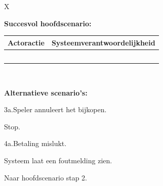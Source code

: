 \begin{xltabular}{\textwidth}{X}
   \hline

   \begin{minipage}[t]{\linewidth}
      \textbf{Succesvol hoofdscenario:}

      \begin{tabularx}{\linewidth}{XX}
         \textbf{Actoractie}                                     & \textbf{Systeemverantwoordelijkheid}                                                        \\
         \hline
         \usecasestep{Speler geeft aan credits te willen kopen.} &                                                                                             \\
                                                                 & \usecasestep{Systeem laat de mogelijke aantallen en de bijbehorende prijzen zien.}          \\
         \usecasestep{Speler kiest een aantal credits.}          &                                                                                             \\
         \usecasestep{Speler betaalt het voorgestelde bedrag.}   &                                                                                             \\
                                                                 & \usecasestep{Systeem schrijft het door de speler gekozen aantal credits bij de speler bij.}
      \end{tabularx}
   \end{minipage} \\

   \hline

   \begin{minipage}[t]{\linewidth}
      \textbf{Alternatieve scenario's:}

      3a.\:Speler annuleert het bijkopen.
      \begin{smallenumerate}
         \item Stop.
      \end{smallenumerate}
      \bigskip

      4a.\:Betaling mislukt.
      \begin{smallenumerate}
         \item Systeem laat een foutmelding zien.
         \item Naar hoofdscenario stap 2.
      \end{smallenumerate}
   \end{minipage} \\

   \hline

\end{xltabular}

